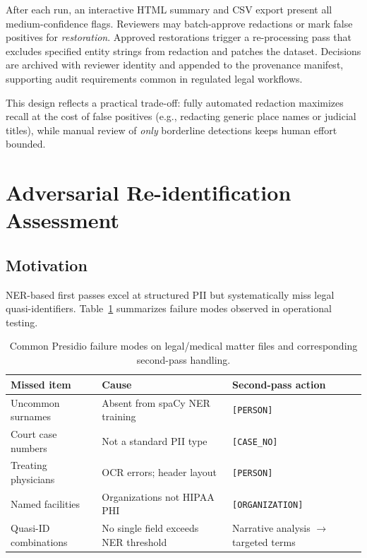 \documentclass[11pt,a4paper]{article}
\begin{document}
After each run, an interactive HTML summary and CSV export present all medium-confidence flags. Reviewers may batch-approve redactions or mark false positives for \emph{restoration}. Approved restorations trigger a re-processing pass that excludes specified entity strings from redaction and patches the dataset. Decisions are archived with reviewer identity and appended to the provenance manifest, supporting audit requirements common in regulated legal workflows.

This design reflects a practical trade-off: fully automated redaction maximizes recall at the cost of false positives (e.g., redacting generic place names or judicial titles), while manual review of \emph{only} borderline detections keeps human effort bounded.

\section{Adversarial Re-identification Assessment}

\subsection{Motivation}

NER-based first passes excel at structured PII but systematically miss legal quasi-identifiers. Table~\ref{tab:failures} summarizes failure modes observed in operational testing.

\begin{table}[ht]
\centering
\caption{Common Presidio failure modes on legal/medical matter files and corresponding second-pass handling.}
\label{tab:failures}
\small
\begin{tabular}{@{}p{2.8cm}p{3.2cm}p{3.5cm}@{}}
\toprule
\textbf{Missed item} & \textbf{Cause} & \textbf{Second-pass action} \\
\midrule
Uncommon surnames & Absent from spaCy NER training & \texttt{[PERSON]} \\
Court case numbers & Not a standard PII type & \texttt{[CASE\_NO]} \\
Treating physicians & OCR errors; header layout & \texttt{[PERSON]} \\
Named facilities & Organizations not HIPAA PHI & \texttt{[ORGANIZATION]} \\
Quasi-ID combinations & No single field exceeds NER threshold & Narrative analysis $\rightarrow$ targeted terms \\
\bottomrule
\end{tabular}
\end{table}
\end{document}
